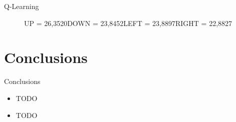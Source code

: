 \documentclass{beamer}
\begin{document}
\begin{frame}{Q-Learning}
\begin{figure}[hp]
  \caption*{\newline UP = 97,6530\newline DOWN = 100,0000\newline LEFT = 93,8538\newline RIGHT = 92,5261}\label{fig:fb}
\endminipage\hfill
{}%
   \caption*{\newline UP = 26,3520\newline DOWN = 23,8452\newline LEFT = 23,8897\newline RIGHT = 22,8827}\label{fig:fc}
 
\endminipage
\end{figure}
\end{frame}


	
\section{Conclusions}

\begin{frame}{Conclusions}
	\begin{itemize}
		\item TODO
		\item TODO
	\end{itemize}
\end{frame}
\end{document}
